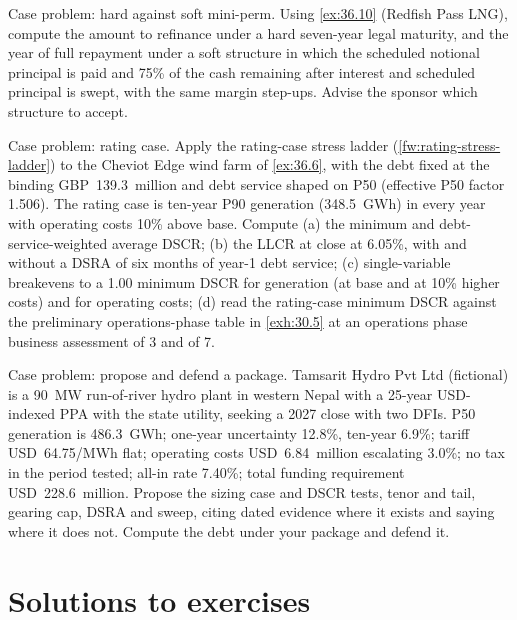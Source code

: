 \begin{exercise}\label{exr:36.17}
Case problem: hard against soft mini-perm. Using \cref{ex:36.10} (Redfish Pass LNG), compute the amount to refinance under a hard seven-year legal maturity, and the year of full repayment under a soft structure in which the scheduled notional principal is paid and 75\% of the cash remaining after interest and scheduled principal is swept, with the same margin step-ups. Advise the sponsor which structure to accept.
\end{exercise}

\begin{exercise}\label{exr:36.18}
Case problem: rating case. Apply the rating-case stress ladder (\cref{fw:rating-stress-ladder}) to the Cheviot Edge wind farm of \cref{ex:36.6}, with the debt fixed at the binding GBP~139.3~million and debt service shaped on P50 (effective P50 factor 1.506). The rating case is ten-year P90 generation (348.5~GWh) in every year with operating costs 10\% above base. Compute (a) the minimum and debt-service-weighted average DSCR; (b) the LLCR at close at 6.05\%, with and without a DSRA of six months of year-1 debt service; (c) single-variable breakevens to a 1.00\x{} minimum DSCR for generation (at base and at 10\% higher costs) and for operating costs; (d) read the rating-case minimum DSCR against the preliminary operations-phase table in \cref{exh:30.5} at an operations phase business assessment of 3 and of 7.
\end{exercise}

\begin{exercise}\label{exr:36.19}
Case problem: propose and defend a package. Tamsarit Hydro Pvt Ltd (fictional) is a 90~MW run-of-river hydro plant in western Nepal with a 25-year USD-indexed PPA with the state utility, seeking a 2027 close with two DFIs. P50 generation is 486.3~GWh; one-year uncertainty 12.8\%, ten-year 6.9\%; tariff USD~64.75/MWh flat; operating costs USD~6.84~million escalating 3.0\%; no tax in the period tested; all-in rate 7.40\%; total funding requirement USD~228.6~million. Propose the sizing case and DSCR tests, tenor and tail, gearing cap, DSRA and sweep, citing dated evidence where it exists and saying where it does not. Compute the debt under your package and defend it.
\end{exercise}

\section{Solutions to exercises}\label{sec:36.17}

